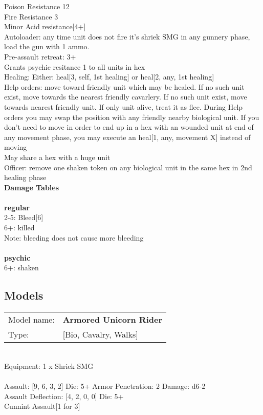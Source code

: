Poison Resistance 12\\ 
Fire Resistance 3\\ 
Minor Acid resistance[4+]\\ 
Autoloader: any time unit does not fire it's shriek SMG in any gunnery phase, load the gun with 1 ammo.\\ 
Pre-assault retreat: 3+\\ 
Grants psychic resitance 1 to all units in hex\\ 
Healing: Either: heal[3, self, 1st healing] or heal[2, any, 1st healing]\\ 
Help orders: move toward friendly unit which may be healed. If no such unit exist, move towards the nearest friendly cavarlery. If no such unit exist, move towards nearest friendly unit. If only unit alive, treat it as flee. During Help orders you may swap the position with any friendly nearby biological unit. If you don't need to move in order to end up in a hex with an wounded unit at end of any movement phase, you may execute an heal[1, any, movement X] instead of moving\\ 
May share a hex with a huge unit\\ 
Officer: remove one shaken token on any biological unit in the same hex in 2nd healing  phase\\ 



{\bf Damage Tables} \\
\ \\ {\bf regular } \\
2-5: Bleed[6] \\
6+: killed \\
Note: bleeding does not cause more bleeding \\
\ \\ {\bf psychic } \\
6+: shaken \\


\pagebreak

\subsection{ Models }

\begin{tabular}{ll}
Model name: & {\bf Armored Unicorn Rider } \\
Type: & [Bio, Cavalry, Walks] \\
\end{tabular}
\ \\
Equipment: 1 x Shriek SMG \\
\ \\
Assault: [9, 6, 3, 2] Die: 5+ Armor Penetration: 2 Damage: d6-2 \\
Assault Deflection: [4, 2, 0, 0] Die: 5+\\
\indent Cunnint Assault[1 for 3]\\ 
 
